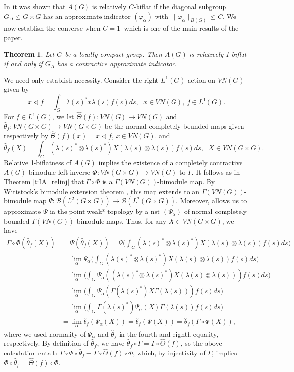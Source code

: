 \documentclass[preprint,12pt]{elsarticle}
\newtheorem{thm}{Theorem}[section]
\newcommand{\mc}[1]{\mathcal{#1}}
\newcommand{\LG}{VN(G)}
\newcommand{\LO}{L^1(G)}
\newcommand{\vphi}{\varphi}
\newcommand{\lm}{\lambda}
\newcommand{\Gam}{\Gamma}
\newcommand{\ten}{\otimes}
\newcommand{\h}[1]{\widehat{#1}}
\providecommand{\norm}[1]{\lVert#1\rVert}
\begin{document}
In \cite[Proposition 2.3]{ARS} it was shown that $A(G)$ is relatively $C$-biflat if the diagonal subgroup $G_\Delta\leq G\times G$ has an approximate indicator $(\vphi_{\alpha})$ with $\norm{\vphi_{\alpha}}_{B(G)}\leq C$. We now establish the converse when $C=1$, which is one of the main results of the paper.

\begin{thm}\label{t:biflat} Let $G$ be a locally compact group. Then $A(G)$ is relatively 1-biflat if and only if $G_\Delta$ has a contractive approximate indicator.
\end{thm}

\begin{pf} We need only establish necessity. Consider the right $\LO$-action on $\LG$ given by
$$x\lhd f=\int_G\lm(s)^*x\lm(s)f(s)ds, \ \ \ x\in\LG, \ f\in\LO.$$
For $f\in\LO$, we let $\h{\Theta}(f):\LG\rightarrow\LG$ and $\h{\theta}_f:VN(G\times G)\rightarrow VN(G\times G)$ be the normal completely bounded maps given respectively by $\h{\Theta}(f)(x)=x\lhd f$, $x\in\LG$, and
$$\h{\theta}_f(X)=\int_G (\lm(s)^*\ten\lm(s)^*)X(\lm(s)\ten\lm(s))f(s)ds, \ \ \ X\in VN(G\times G).$$
Relative 1-biflatness of $A(G)$ implies the existence of a completely contractive $A(G)$-bimodule left inverse $\Phi:VN(G\times G)\rightarrow\LG$ to $\Gam$. It follows as in Theorem \ref{t:IA=relinj}    that $\Gam\circ\Phi$ is a $\Gam(\LG)$-bimodule map. By Wittstock's bimodule extension theorem \cite{Witt2}, this map extends to an $\Gam(\LG)$-bimodule map $\Psi:\mc{B}(L^2(G\times G))\rightarrow\mc{B}(L^2(G\times G))$. Moreover, \cite[Lemma 2.3]{MNW} allows us to approximate $\Psi$ in the point weak* topology by a net $(\Psi_\alpha)$ of normal completely bounded $\Gam(\LG)$-bimodule maps. Thus, for any $X\in VN(G\times G)$, we have
\begin{align*}\Gam\circ\Phi(\h{\theta}_f(X))&=\Psi(\h{\theta}_f(X))=\Psi\bigg(\int_G (\lm(s)^*\ten\lm(s)^*)X(\lm(s)\ten\lm(s))f(s)ds\bigg)\\
&=\lim_\alpha\Psi_\alpha\bigg(\int_G (\lm(s)^*\ten\lm(s)^*)X(\lm(s)\ten\lm(s))f(s)ds\bigg)\\
&=\lim_\alpha\bigg(\int_G \Psi_\alpha((\lm(s)^*\ten\lm(s)^*)X(\lm(s)\ten\lm(s)))f(s)ds\bigg)\\
&=\lim_\alpha\bigg(\int_G \Psi_\alpha(\Gam(\lm(s)^*)X\Gam(\lm(s)))f(s)ds\bigg)\\
&=\lim_\alpha\bigg(\int_G \Gam(\lm(s)^*)\Psi_\alpha(X)\Gam(\lm(s))f(s)ds\bigg)\\
&=\lim_\alpha\h{\theta}_f(\Psi_\alpha(X))=\h{\theta}_f(\Psi(X))=\h{\theta}_f(\Gam\circ\Phi(X)),
\end{align*}
where we used normality of $\Psi_\alpha$ and $\h{\theta}_f$ in the fourth and eighth equality, respectively. By definition of $\h{\theta}_f$, we have $\h{\theta}_f\circ\Gam=\Gam\circ\h{\Theta}(f)$, so the above calculation entails $\Gam\circ\Phi\circ\h{\theta}_f=\Gam\circ\h{\Theta}(f)\circ\Phi$, which, by injectivity of $\Gam$, implies $\Phi\circ\h{\theta}_f=\h{\Theta}(f)\circ\Phi$.


\end{pf}
\end{document}
